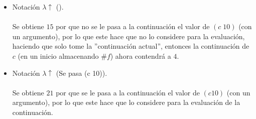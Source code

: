 \begin{itemize}
\item  Notación $\lambda\uparrow$ ().\\
\\

Se obtiene $15$ por que no se le pasa a la continuación el valor de $(c\;10)$
(con un argumento), por lo que este hace que  no lo considere para la
evaluación, haciendo que  solo tome la ''continuación actual'', entonces
la continuación de $c$ (en un inicio almacenando $\#f$) ahora contendrá a $4$.
\item  Notación $\lambda\uparrow$ (Se pasa (c 10)).\\
\\

Se obtiene $21$ por que se le pasa a la continuación el valor de $(c 10)$
(con un argumento), por lo que este hace que  lo considere para la evaluación de la continuación.
\end{itemize}
